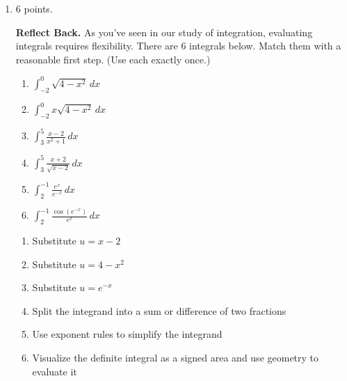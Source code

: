 \documentclass{article}
\begin{document}
\begin{enumerate}

\item 

\begin{grading}
6 points. 
\end{grading}

\begin{problem}
    \textbf{Reflect Back.}  As you've seen in our study of integration,
    evaluating integrals requires flexibility.  There are 6 integrals below.  Match them with a reasonable
    first step. (Use each exactly
    once.)

\begin{minipage}[t]{1.5in}
      \begin{enumerate}
      \item $\displaystyle \int_{-2}^0 \sqrt{4 - x^2}\,dx$

      \item $\displaystyle \int_{-2}^0 x \sqrt{4 - x^2}\,dx$

      \item $\displaystyle \int_3^5 \frac{x - 2}{x^2 + 1}\,dx$

      \item $\displaystyle \int_3^5 \frac{x + 2}{\sqrt{x - 2}}\,dx$

      \item $\displaystyle \int_2^{-1} \frac{e^x}{e^{-x}}\,dx$

      \item $\displaystyle \int_2^{-1} \frac{\cos (e^{-x})}{e^x}\,dx$
      \end{enumerate}
\end{minipage}
\hfill
\begin{minipage}[t]{3in}
\vspace{6pt}
      \begin{enumerate}[label=(\arabic*)]
      \item Substitute $u = x - 2$
      \vspace{16pt}
      \item Substitute $u = 4 - x^2$
      \vspace{15pt}
      \item Substitute $u = e^{-x}$
      \vspace{14pt}
      \item Split the integrand into a sum or difference of two fractions
      \vspace{2pt}
      \item Use exponent rules to simplify the integrand
        \vspace{1pt}
      \item Visualize the definite integral as a signed area and use
        geometry to evaluate it
      \end{enumerate}
\end{minipage}
  \end{problem}
  \pspace{\vfill}


\end{enumerate}
\end{document}
